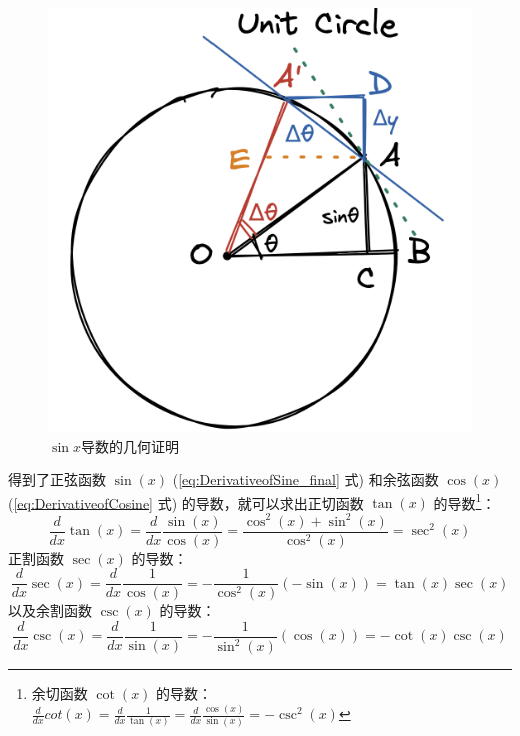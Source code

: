 \documentclass{ctexart}
\numberwithin{equation}{section}
\numberwithin{figure}{section}
\begin{document}
\begin{figure}[H]
    \centering
    \includegraphics[scale=0.4]{images/derivativeofsine_geometric.png}
    \caption{\(\sin x\)导数的几何证明}
    \label{fig:derivativeofsine_geometric}
\end{figure}

得到了正弦函数 \(\sin(x)\) (\ref{eq:DerivativeofSine_final} 式) 和余弦函数 \(\cos(x)\) (\ref{eq:DerivativeofCosine} 式) 的导数，就可以求出正切函数 \(\tan(x)\) 的导数\footnote{余切函数 \(\cot(x)\) 的导数：\(\frac{d}{dx}cot(x) =\frac{d}{dx}\frac{1}{\tan(x)} = \frac{d}{dx}\frac{\cos(x)}{\sin(x)} = -\csc^{2}(x)\)}：
\begin{equation}\label{eq:DerivativeofTangent}
    \frac{d}{dx}\tan(x) =  \frac{d}{dx}\frac{\sin(x)}{\cos(x)} = \frac{\cos^{2}(x) + \sin^{2}(x)}{\cos^{2}(x)} = \sec^{2}(x)
\end{equation}
正割函数 \(\sec(x)\) 的导数：
\begin{equation}\label{eq:DerivativeofSecant}
    \frac{d}{dx}\sec(x) = \frac{d}{dx}\frac{1}{\cos(x)} = - \frac{1}{\cos^{2}(x)}(-\sin(x)) = \tan(x)\sec(x)
\end{equation}
以及余割函数 \(\csc(x)\) 的导数：
\begin{equation}\label{eq:DerivativeofCosecant}
    \frac{d}{dx}\csc(x) = \frac{d}{dx}\frac{1}{\sin(x)} = - \frac{1}{\sin^{2}(x)}(\cos(x)) = - \cot(x)\csc(x)
\end{equation}
\end{document}
